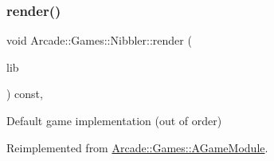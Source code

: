 \subsubsection{\texorpdfstring{render()}{render()}}
{\footnotesize\ttfamily void Arcade\+::\+Games\+::\+Nibbler\+::render (\begin{DoxyParamCaption}\item[{\mbox{\hyperlink{classArcade_1_1Display_1_1IDisplayModule}{Arcade\+::\+Display\+::\+I\+Display\+Module}} \&}]{lib }\end{DoxyParamCaption}) const\hspace{0.3cm}{\ttfamily [final]}, {\ttfamily [virtual]}}

Default game implementation (out of order) 

Reimplemented from \mbox{\hyperlink{classArcade_1_1Games_1_1AGameModule_a5897780d42d5faba3287c29b87f2b498}{Arcade\+::\+Games\+::\+A\+Game\+Module}}.

